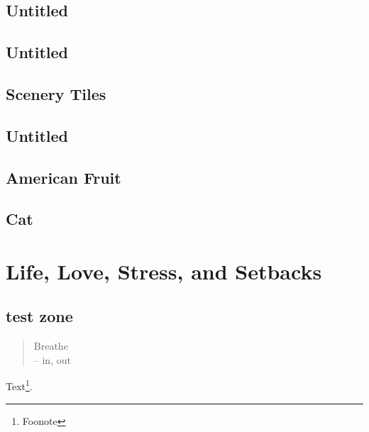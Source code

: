\documentclass[oneside,14pt]{memoir} %
\newcommand{\chapterXXXVIvar}{poem/untitled_14.tex}
\newcommand{\chapterXXXVIIvar}{poem/untitled_15.tex}
\newcommand{\chapterXXXVIIIvar}{poem/scenery_tiles.tex}
\newcommand{\chapterXXXIXvar}{poem/american_fruit.tex}
\newcommand{\chapterXXXXvar}{poem/cat.tex}
\begin{document}
\chapter{Untitled}



\chapter{Untitled}



\chapter{Scenery Tiles}



\chapter{Untitled}



\chapter{American Fruit}



\chapter{Cat}






\part{Life, Love, Stress, and Setbacks}



\chapter{test zone}

\begin{quote}
Breathe\\
-- in, out
\end{quote}

Text\footnote{Foonote}.




\end{document}
